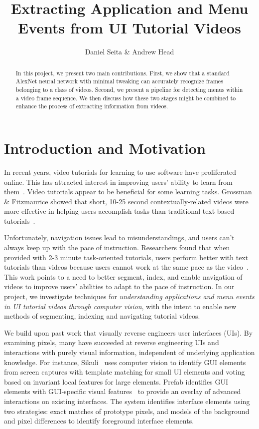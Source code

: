 \documentclass[10pt]{article}
\title{Extracting Application and Menu Events from UI Tutorial Videos}
\author{Daniel Seita \& Andrew Head}
\begin{document}
\maketitle

\begin{abstract}
In this project, we present two main contributions. First, we show that a standard AlexNet neural
network with minimal tweaking can accurately recognize frames belonging to a class of videos.
Second, we present a pipeline for detecting menus within a video frame sequence. We then discuss how
these two stages might be combined to enhance the process of extracting information from videos.
\end{abstract}

\section{Introduction and Motivation}

In recent years, video tutorials for learning to use software have proliferated online.  
This has attracted interest in improving users' ability to learn from them~\cite{matejka_ambient_2011,
pongnumkul_pause-and-play_2011}.  Video tutorials appear to be beneficial for
some learning tasks.  Grossman \& Fitzmaurice showed that short, 10-25 second contextually-related videos were
more effective in helping users accomplish tasks than traditional text-based
tutorials~\cite{grossman_toolclips_2010}.  

Unfortunately, navigation issues lead to misunderstandings, and users can't always keep up with the pace of instruction.
Researchers found that when provided with 2-3 minute task-oriented tutorials, users perform
better with text tutorials than videos because users cannot work at the same pace as the
video~\cite{grabler_generating_2009}. This work points to a need to better segment, index, and 
enable navigation of videos to improve users' abilities to adapt to the pace of instruction.
In our project, we investigate techniques for \emph{understanding applications and menu events in UI tutorial videos through
computer vision}, with the intent to enable new methods of segmenting, indexing and navigating tutorial videos.

We build upon past work that visually reverse engineers user interfaces (UIs).
By examining pixels, many have succeeded at reverse engineering UIs and
interactions with purely visual information, independent of underlying application knowledge.  For
instance, Sikuli~\cite{yeh_sikuli_2009} uses computer vision to identify GUI elements from screen
captures with template matching for small UI elements and voting based on invariant local
features for large elements. Prefab identifies GUI elements with GUI-specific visual features~\cite{dixon_prefab_2010}
to provide an overlay of advanced interactions on existing interfaces.  The system identifies interface
elements using two strategies: exact matches of prototype pixels, and models of the background and
pixel differences to identify foreground interface elements.
\end{document}
